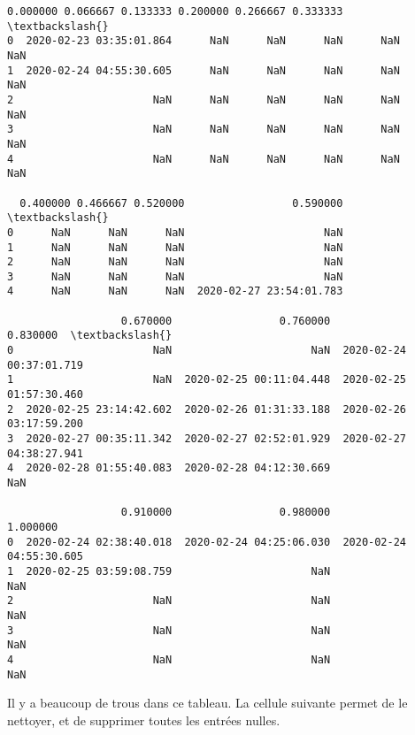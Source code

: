 \documentclass[11pt]{article}
\makeatletter
\newcommand{\boxspacing}{\kern\kvtcb@left@rule\kern\kvtcb@boxsep}
\newcommand{\prompt}[4]{
        \ttfamily\llap{{\color{#2}[#3]:\hspace{3pt}#4}}\vspace{-\baselineskip}
    }
\makeatother
\begin{document}
            \begin{tcolorbox}[breakable, size=fbox, boxrule=.5pt, pad at break*=1mm, opacityfill=0]
\prompt{Out}{outcolor}{201}{\boxspacing}
\begin{Verbatim}[commandchars=\\\{\}]
                  0.000000 0.066667 0.133333 0.200000 0.266667 0.333333  \textbackslash{}
0  2020-02-23 03:35:01.864      NaN      NaN      NaN      NaN      NaN
1  2020-02-24 04:55:30.605      NaN      NaN      NaN      NaN      NaN
2                      NaN      NaN      NaN      NaN      NaN      NaN
3                      NaN      NaN      NaN      NaN      NaN      NaN
4                      NaN      NaN      NaN      NaN      NaN      NaN

  0.400000 0.466667 0.520000                 0.590000  \textbackslash{}
0      NaN      NaN      NaN                      NaN
1      NaN      NaN      NaN                      NaN
2      NaN      NaN      NaN                      NaN
3      NaN      NaN      NaN                      NaN
4      NaN      NaN      NaN  2020-02-27 23:54:01.783

                  0.670000                 0.760000                 0.830000  \textbackslash{}
0                      NaN                      NaN  2020-02-24 00:37:01.719
1                      NaN  2020-02-25 00:11:04.448  2020-02-25 01:57:30.460
2  2020-02-25 23:14:42.602  2020-02-26 01:31:33.188  2020-02-26 03:17:59.200
3  2020-02-27 00:35:11.342  2020-02-27 02:52:01.929  2020-02-27 04:38:27.941
4  2020-02-28 01:55:40.083  2020-02-28 04:12:30.669                      NaN

                  0.910000                 0.980000                 1.000000
0  2020-02-24 02:38:40.018  2020-02-24 04:25:06.030  2020-02-24 04:55:30.605
1  2020-02-25 03:59:08.759                      NaN                      NaN
2                      NaN                      NaN                      NaN
3                      NaN                      NaN                      NaN
4                      NaN                      NaN                      NaN
\end{Verbatim}
\end{tcolorbox}
        
    Il y a beaucoup de trous dans ce tableau. La cellule suivante permet de
le nettoyer, et de supprimer toutes les entrées nulles.
\end{document}

